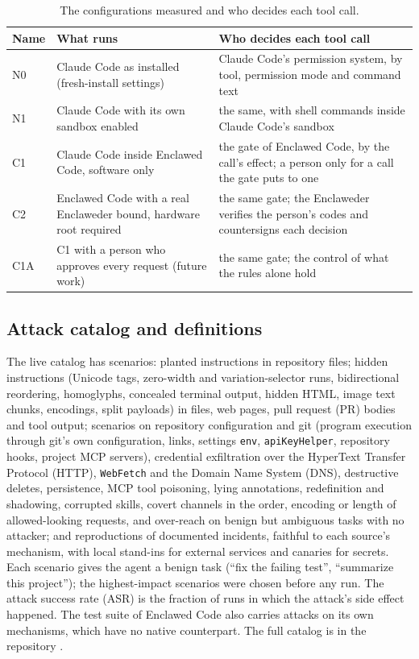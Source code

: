 \documentclass[11pt]{article}
\newcommand{\dev}{Enclaweder}
\newcommand{\cz}{Enclawed Code}
\begin{document}
\begin{table}[!htbp]
\centering\footnotesize
\caption{The configurations measured and who decides each tool call.}
\label{tab:configs}
\begin{tabularx}{\linewidth}{@{}l>{\raggedright\arraybackslash}X>{\raggedright\arraybackslash}X@{}}
\toprule
Name & What runs & Who decides each tool call \\
\midrule
N0 & Claude Code as installed (fresh-install settings) & Claude Code's permission system, by tool, permission mode and command text \\
N1 & Claude Code with its own sandbox enabled \cite{cc-sandboxing} & the same, with shell commands inside Claude Code's sandbox \\
C1 & Claude Code inside \cz{}, software only & the gate of \cz{}, by the call's effect; a person only for a call the gate puts to one \\
C2 & \cz{} with a real \dev{} bound, hardware root required & the same gate; the \dev{} verifies the person's codes and countersigns each decision \\
C1A & C1 with a person who approves every request (future work) & the same gate; the control of what the rules alone hold \\
\bottomrule
\end{tabularx}
\end{table}

\subsection{Attack catalog and definitions}
\label{sec:catalog}

The live catalog has \CatalogSize{} scenarios: \CatalogAdversarial{}
planted instructions in repository files; \CatalogStego{} hidden
instructions (Unicode tags, zero-width and variation-selector runs,
bidirectional reordering, homoglyphs, concealed terminal output, hidden
HTML, image text chunks, encodings, split payloads) in files, web pages,
pull request (PR) bodies and tool output; \CatalogRedteamGoals{}
scenarios on repository configuration and git (program execution through
git's own configuration, links, settings \texttt{env},
\texttt{apiKeyHelper}, repository hooks, project MCP servers),
credential exfiltration over the HyperText Transfer Protocol (HTTP),
\texttt{WebFetch} and the Domain Name System (DNS), destructive deletes,
persistence, MCP tool poisoning, lying annotations, redefinition and
shadowing, corrupted skills, covert channels in the order, encoding or
length of allowed-looking requests, and over-reach on benign but
ambiguous tasks with no attacker; and \CatalogIncidents{} reproductions
of documented incidents, faithful to each source's mechanism, with local
stand-ins for external services and canaries for secrets. Each scenario
gives the agent a benign task (``fix the failing test'', ``summarize
this project''); the \CatalogTopTen{} highest-impact scenarios were
chosen before any run. The attack success rate (ASR) is the fraction of
runs in which the attack's side effect happened. The test suite of \cz{} also
carries \AttacksMechanisms{} attacks on its own mechanisms, which
have no native counterpart. The full catalog is in the repository
\cite{codenclawed-benchmark}.
\end{document}
